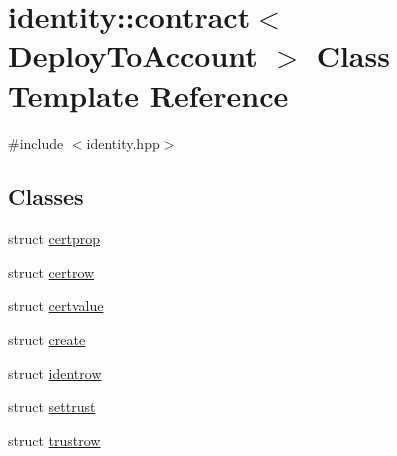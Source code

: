 \hypertarget{classidentity_1_1contract}{}\section{identity\+:\+:contract$<$ Deploy\+To\+Account $>$ Class Template Reference}
\label{classidentity_1_1contract}


{\ttfamily \#include $<$identity.\+hpp$>$}

\subsection*{Classes}
\begin{DoxyCompactItemize}
\item 
struct \mbox{\hyperlink{structidentity_1_1contract_1_1certprop}{certprop}}
\item 
struct \mbox{\hyperlink{structidentity_1_1contract_1_1certrow}{certrow}}
\item 
struct \mbox{\hyperlink{structidentity_1_1contract_1_1certvalue}{certvalue}}
\item 
struct \mbox{\hyperlink{structidentity_1_1contract_1_1create}{create}}
\item 
struct \mbox{\hyperlink{structidentity_1_1contract_1_1identrow}{identrow}}
\item 
struct \mbox{\hyperlink{structidentity_1_1contract_1_1settrust}{settrust}}
\item 
struct \mbox{\hyperlink{structidentity_1_1contract_1_1trustrow}{trustrow}}
\end{DoxyCompactItemize}
